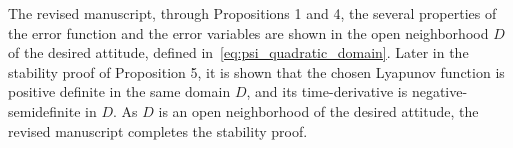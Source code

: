 \documentclass[11pt]{article}
\newcommand{\norm}[1]{\ensuremath{\left\| #1 \right\|}}
\newcommand{\braces}[1]{\ensuremath{\left\{ #1 \right\}}}
\newcommand{\parenth}[1]{\ensuremath{\left( #1 \right)}}
\newcommand{\dirDiff}[2]{\ensuremath{\mathbf{D}_{#2} #1 \cdot \delta #2}} %
\newcommand{\SO}{\ensuremath{\mathsf{SO(3)}}}
\newcommand{\Hess}{\ensuremath{\mathrm{Hess}}}
\newenvironment{correction}{\begin{list}{}{\setlength{\leftmargin}{1cm}\setlength{\rightmargin}{1cm}}\vspace{\parsep}\item[]``}{''\end{list}}
\begin{document}
\begin{enumerate}
The revised manuscript, through Propositions 1 and 4, the several properties of the error function and the error variables are shown in the open neighborhood $D$ of the desired attitude, defined in~\cref{eq:psi_quadratic_domain}.  Later in the stability proof of Proposition 5, it is shown that the chosen Lyapunov function is positive definite in the same domain $D$, and its time-derivative is negative-semidefinite in $D$.  As $D$ is an open neighborhood of the desired attitude, the revised manuscript completes the stability proof. 


%

\end{enumerate}
\end{document}
